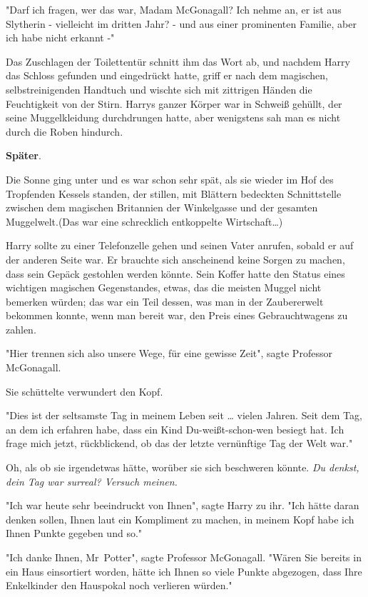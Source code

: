 {"Darf ich fragen, wer das war, Madam McGonagall? Ich nehme an, er ist aus Slytherin - vielleicht im dritten Jahr? - und aus einer prominenten Familie, aber ich habe nicht erkannt -"

Das Zuschlagen der Toilettentür schnitt ihm das Wort ab, und nachdem Harry das Schloss gefunden und eingedrückt hatte, griff er nach dem magischen, selbstreinigenden Handtuch und wischte sich mit zittrigen Händen die Feuchtigkeit von der Stirn. Harrys ganzer Körper war in Schweiß gehüllt, der seine Muggelkleidung durchdrungen hatte, aber wenigstens sah man es nicht durch die Roben hindurch.

\textbf{Später}.

Die Sonne ging unter und es war schon sehr spät, als sie wieder im Hof des Tropfenden Kessels standen, der stillen, mit Blättern bedeckten Schnittstelle zwischen dem magischen Britannien der Winkelgasse und der gesamten Muggelwelt.(Das war eine schrecklich entkoppelte Wirtschaft…)

Harry sollte zu einer Telefonzelle gehen und seinen Vater anrufen, sobald er auf der anderen Seite war. Er brauchte sich anscheinend keine Sorgen zu machen, dass sein Gepäck gestohlen werden könnte. Sein Koffer hatte den Status eines wichtigen magischen Gegenstandes, etwas, das die meisten Muggel nicht bemerken würden; das war ein Teil dessen, was man in der Zaubererwelt bekommen konnte, wenn man bereit war, den Preis eines Gebrauchtwagens zu zahlen.

"Hier trennen sich also unsere Wege, für eine gewisse Zeit", sagte Professor McGonagall.

Sie schüttelte verwundert den Kopf.

"Dies ist der seltsamste Tag in meinem Leben seit … vielen Jahren. Seit dem Tag, an dem ich erfahren habe, dass ein Kind Du-weißt-schon-wen besiegt hat. Ich frage mich jetzt, rückblickend, ob das der letzte vernünftige Tag der Welt war."

Oh, als ob sie irgendetwas hätte, worüber sie sich beschweren könnte. \emph{Du denkst, dein Tag war surreal? Versuch meinen.}

"Ich war heute sehr beeindruckt von Ihnen", sagte Harry zu ihr. "Ich hätte daran denken sollen, Ihnen laut ein Kompliment zu machen, in meinem Kopf habe ich Ihnen Punkte gegeben und so."

"Ich danke Ihnen, Mr~Potter", sagte Professor McGonagall. "Wären Sie bereits in ein Haus einsortiert worden, hätte ich Ihnen so viele Punkte abgezogen, dass Ihre Enkelkinder den Hauspokal noch verlieren würden."

}
